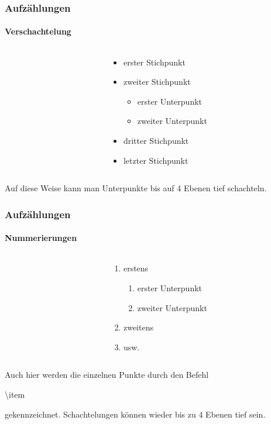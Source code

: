 \begin{frame}
\frametitle{Aufzählungen}
\framesubtitle{Verschachtelung}

\begin{columns}
\begin{column}{.5\textwidth}
\begin{ttfamily}

\end{ttfamily}
\end{column}
\begin{column}{.5\textwidth}
\begin{itemize}
\item erster Stichpunkt
\item zweiter Stichpunkt
\begin{itemize}
\item erster Unterpunkt
\item zweiter Unterpunkt
\end{itemize}
\item dritter Stichpunkt
\item letzter Stichpunkt
\end{itemize}
\end{column}
\end{columns}
\bigskip
Auf diese Weise kann man Unterpunkte bis auf 4 Ebenen tief schachteln.
\end{frame}


\begin{frame}
\frametitle{Aufzählungen}
\framesubtitle{Nummerierungen}

\begin{columns}
\begin{column}{.5\textwidth}
\begin{ttfamily}

\end{ttfamily}
\end{column}
\begin{column}{.5\textwidth}
\begin{enumerate}
\item erstens
\begin{enumerate}
\item erster Unterpunkt
\item zweiter Unterpunkt
\end{enumerate}
\item zweitens
\item usw.
\end{enumerate}
\end{column}
\end{columns}
\bigskip
Auch hier werden die einzelnen Punkte durch den Befehl \begin{ttfamily}\color{nounibaredI}\textbackslash item\color{black}\end{ttfamily} gekennzeichnet. 
Schachtelungen können wieder bis zu 4 Ebenen tief sein.
\end{frame}

